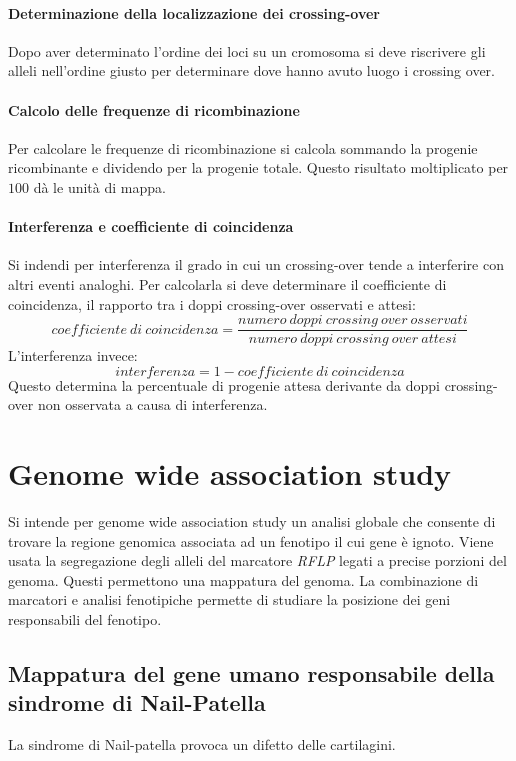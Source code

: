 			\paragraph{Determinazione della localizzazione dei crossing-over}
			Dopo aver determinato l'ordine dei loci su un cromosoma si deve riscrivere gli alleli nell'ordine giusto per determinare dove hanno avuto luogo i crossing over.

			\paragraph{Calcolo delle frequenze di ricombinazione}
			Per calcolare le frequenze di ricombinazione si calcola sommando la progenie ricombinante e dividendo per la progenie totale.
			Questo risultato moltiplicato per $100$ d\`a le unit\`a di mappa.

			\paragraph{Interferenza e coefficiente di coincidenza}
			Si indendi per interferenza il grado in cui un crossing-over tende a interferire con altri eventi analoghi.
			Per calcolarla si deve determinare il coefficiente di coincidenza, il rapporto tra i doppi crossing-over osservati e attesi:
			\[coefficiente\ di\ coincidenza = \dfrac{numero\ doppi\ crossing\ over\ osservati}{numero\ doppi\ crossing\ over\ attesi}\]
			L'interferenza invece:
			\[interferenza = 1 - coefficiente\ di\ coincidenza\]
			Questo determina la percentuale di progenie attesa derivante da doppi crossing-over non osservata a causa di interferenza.

\section{Genome wide association study}
Si intende per genome wide association study un analisi globale che consente di trovare la regione genomica associata ad un fenotipo il cui gene \`e ignoto.
Viene usata la segregazione degli alleli del marcatore \emph{RFLP} legati a precise porzioni del genoma.
Questi permettono una mappatura del genoma.
La combinazione di marcatori e analisi fenotipiche permette di studiare la posizione dei geni responsabili del fenotipo.

	\subsection{Mappatura del gene umano responsabile della sindrome di Nail-Patella}
	La sindrome di Nail-patella provoca un difetto delle cartilagini.

